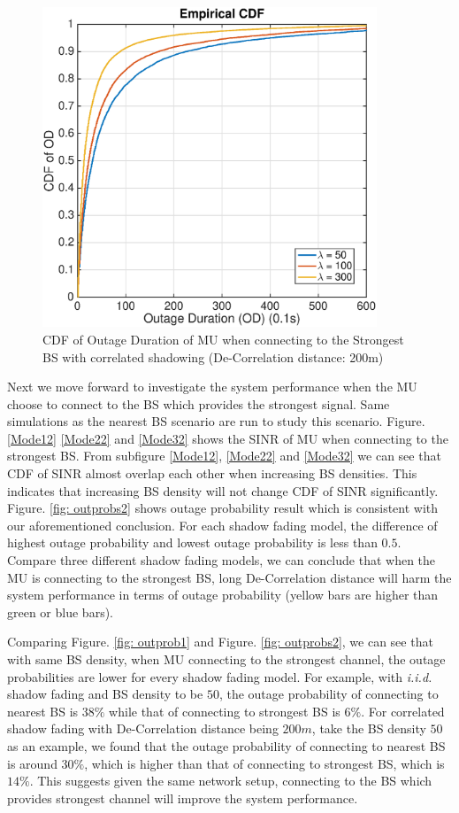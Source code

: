 \begin{figure}
\centering
\includegraphics[width=10cm]{ODthresh-5DeCorr200Max.eps}
\caption{CDF of Outage Duration of MU when connecting to the Strongest BS with correlated shadowing (De-Correlation distance: 200m)}
\label{corr2}
\end{figure}
\par Next we move forward to investigate the system performance when the MU choose to connect to the BS which provides the strongest signal. Same simulations as the nearest BS scenario are run to study this scenario. Figure. \ref{Mode12} \ref{Mode22} and \ref{Mode32} shows the SINR of MU when connecting to the strongest BS. From subfigure \ref{Mode12}, \ref{Mode22} and \ref{Mode32} we can see that CDF of SINR almost overlap each other when increasing BS densities. This indicates that increasing BS density will not change CDF of SINR significantly. Figure. \ref{fig: outprobs2} shows outage probability result which is consistent with our aforementioned conclusion. For each shadow fading model, the difference of highest outage probability and lowest outage probability is less than $0.5$. Compare three different shadow fading models, we can conclude that when the MU is connecting to the strongest BS, long De-Correlation distance will harm the system performance in terms of outage probability (yellow bars are higher than green or blue bars). 
\par Comparing Figure. \ref{fig: outprob1} and Figure. \ref{fig: outprobs2}, we can see that with same BS density, when MU connecting to the strongest channel, the outage probabilities are lower for every shadow fading model. For example, with \emph{i.i.d.} shadow fading and BS density to be $50$, the outage probability of connecting to nearest BS is $38\%$ while that of connecting to strongest BS is $6\%$. For correlated shadow fading with De-Correlation distance being $200m$, take the BS density $50$ as an example, we found that the outage probability of connecting to nearest BS is around $30\%$, which is higher than that of connecting to strongest BS, which is $14\%$. This suggests given the same network setup, connecting to the BS which provides strongest channel will improve the system performance. 








